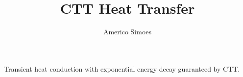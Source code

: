 \documentclass[12pt]{article}
\begin{document}
\title{CTT Heat Transfer}
\author{Americo Simoes}
\maketitle
Transient heat conduction with exponential energy decay guaranteed by CTT.
\end{document}
